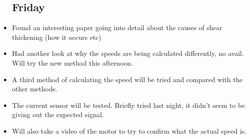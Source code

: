 \documentclass[a4]{report}
\begin{document}
\begin{itemize}
		\subsection*{Friday}
		\item Found an interesting paper going into detail about the causes of shear thickening (how it occurs etc)
		\item Had another look at why the speeds are being calculated differently, no avail. Will try the new method this afternoon.
		\item A third method of calculating the speed will be tried and compared with the other methods.
		\item The current sensor will be tested. Briefly tried last night, it didn't seem to be giving out the expected signal.
		\item Will also take a video of the motor to try to confirm what the actual speed is.
	\end{itemize}
	\newpage
\end{document}
